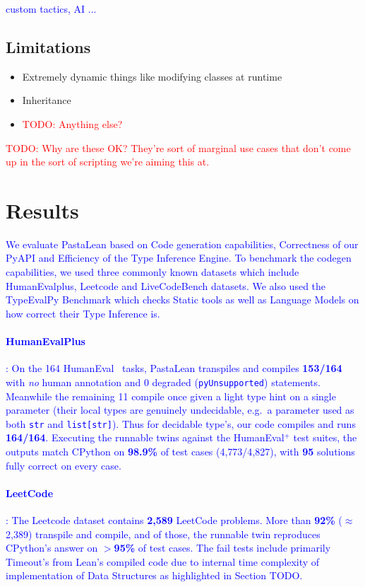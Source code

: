 \documentclass{article}
\newcommand{\code}{\lstinline}
\newcommand{\todo}[1]{\textcolor{red}{TODO: #1}}
\newcommand{\suggest}[1]{\textcolor{blue}{#1}}
\begin{document}
{\suggest{custom tactics, AI ...}

\subsection{Limitations}

\begin{itemize}
    \item Extremely dynamic things like modifying classes at runtime
    \item Inheritance
    \item \todo{Anything else?}
\end{itemize}

\todo{Why are these OK? They're sort of marginal use cases that don't come up in the sort of scripting we're aiming this at.}

\section{Results}\label{results}

\suggest{We evaluate PastaLean based on Code generation capabilities, Correctness of our PyAPI and Efficiency of the Type Inference Engine. To benchmark the codegen capabilities, we used three commonly known datasets which include HumanEvalplus, Leetcode and LiveCodeBench datasets. We also used the TypeEvalPy Benchmark which checks Static tools as well as Language Models on how correct their Type Inference is.}

\suggest{\paragraph{HumanEvalPlus}: On the 164 HumanEval~\cite{chen2021codex} tasks, PastaLean transpiles and compiles \textbf{153/164} with \emph{no} human annotation and $0$ degraded (\code{pyUnsupported}) statements. Meanwhile the remaining 11 compile once given a light type hint on a single parameter (their local types are genuinely undecidable, e.g.\ a parameter used as both \code{str} and \code{list[str]}). Thus for decidable type's, our code compiles and runs \textbf{164/164}. Executing the runnable twins against the HumanEval$^+$ test suites, the outputs match CPython on \textbf{98.9\%} of test cases (4{,}773/4{,}827), with \textbf{95} solutions fully correct on every case.}

\suggest{\paragraph{LeetCode}: The Leetcode dataset contains \textbf{2{,}589} LeetCode problems. More than \textbf{92\%} ($\approx$2{,}389) transpile and compile, and of those, the runnable twin reproduces CPython's answer on \textbf{$>$95\%} of test cases. The fail tests include primarily Timeout's from Lean's compiled code due to internal time complexity of implementation of Data Structures as highlighted in Section TODO.}

}
\end{document}
